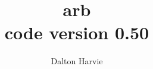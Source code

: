 %
% 
% 
% 
% 
% 
% 
% 
%




\title{arb\\[1ex]\large{code version 0.50}}
\author{Dalton Harvie}

\maketitle



